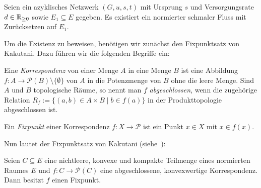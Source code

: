 \begin{theorem}\label{thm-existence-thin-flow}
	Seien ein azyklisches Netzwerk $(G,u,s,t)$ mit Ursprung $s$ und Versorgungsrate $d\in\mathbb{R}_{\geq 0}$ sowie $E_1\subseteq E$ gegeben.
	Es existiert ein normierter schmaler Fluss mit Zurücksetzen auf $E_1$.
\end{theorem}

Um die Existenz zu beweisen, benötigen wir zunächst den Fixpunktsatz von Kakutani.
Dazu führen wir die folgenden Begriffe ein:

\begin{definition}
	Eine \emph{Korrespondenz} von einer Menge $A$ in eine Menge $B$ ist eine Abbildung $f: A \to \mathcal{P}(B)\setminus \{ \emptyset \}$ von $A$ in die Potenzmenge von $B$ ohne die leere Menge.
	Sind $A$ und $B$ topologische Räume, so nennt man $f$ \emph{abgeschlossen}, wenn die zugehörige Relation $R_f := \{ (a,b) \in A\times B \mid b\in f(a)  \}$ in der Produkttopologie abgeschlossen ist.

	Ein \emph{Fixpunkt} einer Korrespondenz $f: X \to \mathcal{P}$ ist ein Punkt $x\in X$ mit $x\in f(x)$.
\end{definition}

Nun lautet der Fixpunktsatz von Kakutani (siehe~\cite{Heuser1991Fix}):

\begin{satz}\label{satz-kakutani}
	Seien $C\subseteq E$ eine nichtleere, konvexe und kompakte Teilmenge eines normierten Raumes $E$ und $f: C \to \mathcal{P}(C)$ eine abgeschlossene, konvexwertige Korrespondenz.
	Dann besitzt $f$ einen Fixpunkt.
\end{satz}

